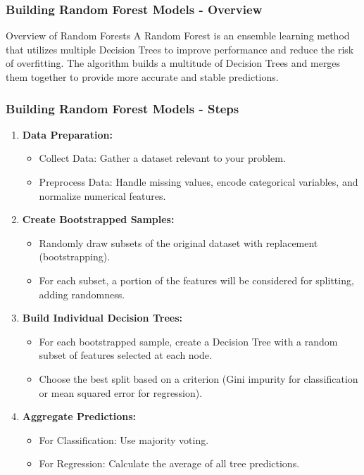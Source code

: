\documentclass[aspectratio=169]{beamer}
\begin{document}
\begin{frame}[fragile]
    \frametitle{Building Random Forest Models - Overview}
    \begin{block}{Overview of Random Forests}
        A Random Forest is an ensemble learning method that utilizes multiple Decision Trees to improve performance and reduce the risk of overfitting. 
        The algorithm builds a multitude of Decision Trees and merges them together to provide more accurate and stable predictions.
    \end{block}
\end{frame}

\begin{frame}[fragile]
    \frametitle{Building Random Forest Models - Steps}
    \begin{enumerate}
        \item \textbf{Data Preparation:}
            \begin{itemize}
                \item Collect Data: Gather a dataset relevant to your problem.
                \item Preprocess Data: Handle missing values, encode categorical variables, and normalize numerical features.
            \end{itemize}
        
        \item \textbf{Create Bootstrapped Samples:}
            \begin{itemize}
                \item Randomly draw subsets of the original dataset with replacement (bootstrapping).
                \item For each subset, a portion of the features will be considered for splitting, adding randomness.
            \end{itemize}

        \item \textbf{Build Individual Decision Trees:}
            \begin{itemize}
                \item For each bootstrapped sample, create a Decision Tree with a random subset of features selected at each node.
                \item Choose the best split based on a criterion (Gini impurity for classification or mean squared error for regression).
            \end{itemize}
        
        \item \textbf{Aggregate Predictions:}
            \begin{itemize}
                \item For Classification: Use majority voting.
                \item For Regression: Calculate the average of all tree predictions.
            \end{itemize}
        

\end{enumerate}
\end{frame}
\end{document}

